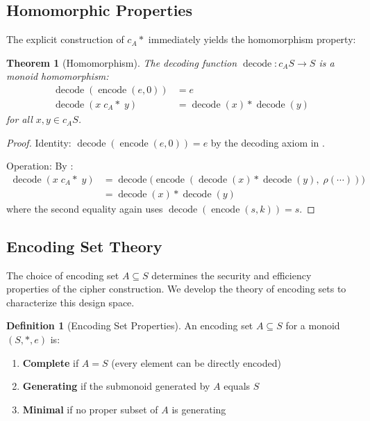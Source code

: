 \documentclass[11pt]{article}
\theoremstyle{definition}
\newtheorem{definition}{Definition}[section]
\theoremstyle{plain}
\newtheorem{theorem}{Theorem}[section]
\theoremstyle{remark}
\newcommand{\cipher}[1]{c_{#1}}
\newcommand{\encode}{\operatorname{encode}}
\newcommand{\decode}{\operatorname{decode}}
\begin{document}
\subsection{Homomorphic Properties}

The explicit construction of $\cipher{A}*$ immediately yields the homomorphism property:

\begin{theorem}[Homomorphism]
\label{thm:homomorphism}
The decoding function $\decode: \cipher{A}S \to S$ is a monoid homomorphism:
\begin{align}
\decode(\encode(e,0)) &= e\\
\decode(x \;\cipher{A}* \;y) &= \decode(x) * \decode(y)
\end{align}
for all $x, y \in \cipher{A}S$.
\end{theorem}

\begin{proof}
Identity: $\decode(\encode(e,0)) = e$ by the decoding axiom in .

Operation: By :
\begin{align*}
\decode(x \;\cipher{A}*\; y)
  &= \decode\!\big(\encode(\decode(x) * \decode(y),\; \rho(\cdots))\big) \\
  &= \decode(x) * \decode(y)
\end{align*}
where the second equality again uses $\decode(\encode(s,k)) = s$.
\end{proof}

\subsection{Encoding Set Theory}
\label{subsec:encoding-sets}

The choice of encoding set $A \subseteq S$ determines the security and efficiency properties of the cipher construction. We develop the theory of encoding sets to characterize this design space.

\begin{definition}[Encoding Set Properties]
\label{def:encoding-set}
An encoding set $A \subseteq S$ for a monoid $(S, *, e)$ is:
\begin{enumerate}
\item \textbf{Complete} if $A = S$ (every element can be directly encoded)
\item \textbf{Generating} if the submonoid generated by $A$ equals $S$
\item \textbf{Minimal} if no proper subset of $A$ is generating
\end{enumerate}
\end{definition}
\end{document}
